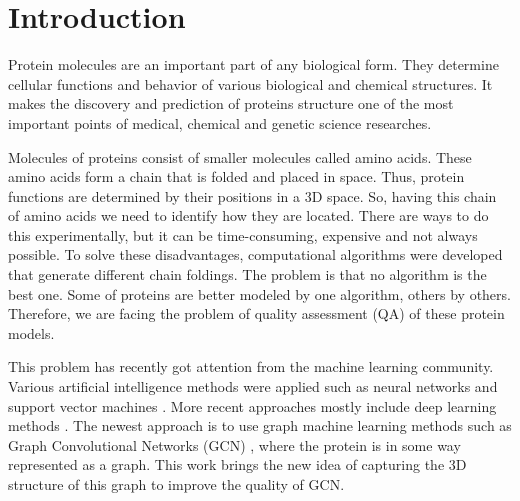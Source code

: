 \documentclass[12pt,twoside]{article}
\title
{Quality prediction of proteins models with spherical convolutions on three-dimensional graphs.}
\author
{Nikita Pavlichenko, Sergei Grudinin, Ilia Igashov.} %
\begin{document}
	
	\maketitle
	
	\section{Introduction}
	Protein molecules are an important part of any biological form. They determine cellular 
	functions and behavior of various biological and chemical structures. It makes the discovery 
	and prediction of proteins structure one of the most important points of medical, chemical 
	and genetic science researches.

	Molecules of proteins consist of smaller molecules called amino acids. These amino acids
	form a chain that is folded and placed in space. Thus, protein functions are determined
	by their positions in a 3D space. So, having this chain of amino acids we need to identify
	how they are located. There are ways to do this experimentally, but it can be time-consuming,
	expensive and not always possible. To solve these disadvantages, computational algorithms \cite{Arnold2005}\cite{Lundstroem2008}\cite{Xu2019}
	were developed that generate different chain foldings. The problem is that no algorithm is the 
	best one. Some of proteins are better modeled by one algorithm, others by others. Therefore, we 
	are facing the problem of quality assessment (QA) of these protein models.

	This problem has recently got attention from the machine learning community. Various artificial
	intelligence methods were applied such as neural networks \cite{Wallner2003} and support vector machines \cite{Ray2012}\cite{Uziela2016}.
	More recent approaches mostly include deep learning methods \cite{Hurtado2018}\cite{Derevyanko2018}\cite{Pages2019}\cite{Conover2019}. The newest approach is to use graph
	machine learning methods such as Graph Convolutional Networks (GCN) \cite{Baldassarre2020GRAPHQAPM}, where the protein is in some
	way represented as a graph. This work brings the new idea of capturing the 3D structure of this graph 
	to improve the quality of GCN.
\end{document}
